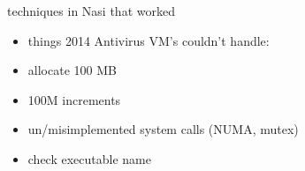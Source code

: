 \begin{frame}{techniques in Nasi that worked}
    \begin{itemize}
    \item things 2014 Antivirus VM's couldn't handle:
    \vspace{.5cm}
    \item allocate 100 MB
    \item 100M increments
    \item un/misimplemented system calls (NUMA, mutex)
    \item check executable name
    \end{itemize}
\end{frame}



